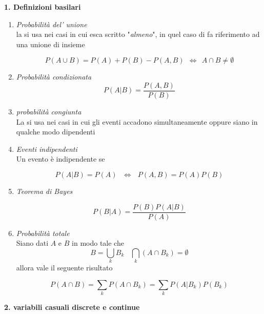 \documentclass[]{article}
\begin{document}
\textbf{1. Definizioni basilari}

\begin{enumerate}

\item \textit{Probabilità del' unione } \\
la si usa nei casi in cui esca scritto "\textit{almeno}", in quel caso di fa riferimento ad una unione di insieme

\begin{equation}
P(A\cup B) = P(A)+P(B)-P(A, B) \ \ \Leftrightarrow \ \ A\cap B \neq \emptyset
\end{equation}

\item \textit{Probabilità condizionata } \\

\begin{equation}
P(A | B)= \frac{P(A, B)}{P(B)}
\end{equation}

\item \textit{probabilità congiunta} \\
La si usa nei casi in cui gli eventi accadono simultaneamente oppure siano in qualche modo dipendenti

\item \textit{Eventi indipendenti}
\\ Un evento è indipendente se

\begin{equation}
P(A | B)= P(A) \ \ \ \Leftrightarrow  \ \ \ P(A,B)=P(A)P(B)
\end{equation}

\item \textit{Teorema di Bayes}

\begin{equation}
P(B|A)=\frac{P(B) P(A|B)}{P(A)} 
\end{equation}

\item \textit{Probabilità totale}
\\ Siano dati $A$ e $B$ in modo tale che
\[B=\bigcup_{k} B_k  \ \ \ \ \bigcap_k (A\cap B_k)= \emptyset \]
allora vale il seguente risultato 

\begin{equation}
P(A \cap B)=\sum_k P(A \cap B_k)= \sum_k P(A | B_k)P(B_k)
\end{equation}

\end{enumerate}

\newpage 
\textbf{2. variabili casuali discrete e continue}
\\ 
\\
\end{document}
